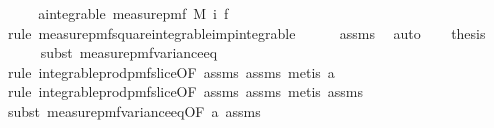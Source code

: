 \begin{isabellebody}
%
\isadelimproof
%
\endisadelimproof
%
\isatagproof
{}\isamarkupfalse%
\ {\isacharminus}{\kern0pt}\isanewline
\ \ \isamarkupfalse%
\ a{\isacharcolon}{\kern0pt}{\isachardoublequoteopen}integrable\ {\isacharparenleft}{\kern0pt}measure{\isacharunderscore}{\kern0pt}pmf\ {\isacharparenleft}{\kern0pt}M\ i{\isacharparenright}{\kern0pt}{\isacharparenright}{\kern0pt}\ f{\isachardoublequoteclose}\isanewline
\ \ \ \ \isamarkupfalse%
\ {\isacharparenleft}{\kern0pt}rule\ measure{\isacharunderscore}{\kern0pt}pmf{\isachardot}{\kern0pt}square{\isacharunderscore}{\kern0pt}integrable{\isacharunderscore}{\kern0pt}imp{\isacharunderscore}{\kern0pt}integrable{\isacharparenright}{\kern0pt}\isanewline
\ \ \ \ \isamarkupfalse%
\ assms{\isacharparenleft}{\kern0pt}{}{\isacharparenright}{\kern0pt}\ \isamarkupfalse%
\ auto\isanewline
\isanewline
\ \ \isamarkupfalse%
\ {\isacharquery}{\kern0pt}thesis\isanewline
\ \ \ \ \isamarkupfalse%
\ {\isacharparenleft}{\kern0pt}subst\ measure{\isacharunderscore}{\kern0pt}pmf{\isachardot}{\kern0pt}variance{\isacharunderscore}{\kern0pt}eq{\isacharparenright}{\kern0pt}\isanewline
\ \ \ \ \ \ \isamarkupfalse%
\ {\isacharparenleft}{\kern0pt}rule\ integrable{\isacharunderscore}{\kern0pt}prod{\isacharunderscore}{\kern0pt}pmf{\isacharunderscore}{\kern0pt}slice{\isacharbrackleft}{\kern0pt}OF\ assms{\isacharparenleft}{\kern0pt}{}{\isacharparenright}{\kern0pt}\ assms{\isacharparenleft}{\kern0pt}{}{\isacharparenright}{\kern0pt}{\isacharbrackright}{\kern0pt}{\isacharcomma}{\kern0pt}\ metis\ a{\isacharparenright}{\kern0pt}\isanewline
\ \ \ \ \ \isamarkupfalse%
\ {\isacharparenleft}{\kern0pt}rule\ integrable{\isacharunderscore}{\kern0pt}prod{\isacharunderscore}{\kern0pt}pmf{\isacharunderscore}{\kern0pt}slice{\isacharbrackleft}{\kern0pt}OF\ assms{\isacharparenleft}{\kern0pt}{}{\isacharparenright}{\kern0pt}\ assms{\isacharparenleft}{\kern0pt}{}{\isacharparenright}{\kern0pt}{\isacharbrackright}{\kern0pt}{\isacharcomma}{\kern0pt}\ metis\ assms{\isacharparenleft}{\kern0pt}{}{\isacharparenright}{\kern0pt}{\isacharparenright}{\kern0pt}\isanewline
\ \ \ \ \isamarkupfalse%
\ {\isacharparenleft}{\kern0pt}subst\ measure{\isacharunderscore}{\kern0pt}pmf{\isachardot}{\kern0pt}variance{\isacharunderscore}{\kern0pt}eq{\isacharbrackleft}{\kern0pt}OF\ a\ assms{\isacharparenleft}{\kern0pt}{}{\isacharparenright}{\kern0pt}{\isacharbrackright}{\kern0pt}{\isacharparenright}{\kern0pt}\isanewline

\end{isabellebody}
